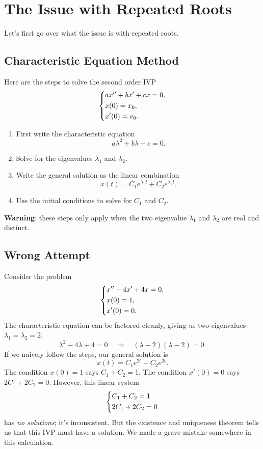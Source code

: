\documentclass[10pt,letterpaper]{article}
\begin{document}

\section{The Issue with Repeated Roots}
Let's first go over what the issue is with repeated roots.

\subsection{Characteristic Equation Method}
Here are the steps to solve the second order IVP
\[
\begin{dcases}
ax''+bx'+cx=0,\\
x(0)=x_0,\\
x'(0)=v_0.
\end{dcases}
\]

\begin{enumerate}
    \item First write the characteristic equation
\[
a\lambda^2+b\lambda+c=0.
\]
    \item Solve for the eigenvalues $\lambda_1$ and $\lambda_2$.
    \item Write the general solution as the linear combination
    \[
    x(t)=C_1e^{\lambda_1t}+C_2e^{\lambda_2t}.
    \]
    \item Use the initial conditions to solve for $C_1$ and $C_2$.\\
\end{enumerate}
\textbf{Warning}: these steps only apply when the two eigenvalue $\lambda_1$ and $\lambda_2$ are real and distinct.


\subsection{Wrong Attempt}
Consider the problem 
\[
\begin{dcases}
x''-4x'+4x=0, \\
x(0) = 1,\\
x'(0)=0.
\end{dcases}
\]
The characteristic equation can be factored cleanly, giving us two eigenvalues $\lambda_1=\lambda_2=2$. 
\[
\lambda^2-4\lambda+4=0
\quad\Rightarrow\quad
(\lambda-2)(\lambda-2)=0.
\]
If we naively follow the steps, our general solution is
\[
x(t)=C_1e^{2t}+C_2e^{2t}.
\]
The condition $x(0)=1$ says $C_1+C_2=1$. The condition $x'(0)=0$ says $2C_1+2C_2=0$. However, this linear system 
$$
\begin{dcases}
    C_1+C_2=1\\
    2C_1+2C_2=0 
\end{dcases}
$$
has \textit{no solutions}; it's inconsistent. But the existence and uniqueness theorem tells us that this IVP must have a solution. We made a grave mistake somewhere in this calculation.
\end{document}
